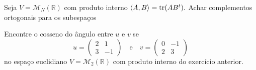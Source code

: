 \documentclass[11pt,a4paper]{article}
\begin{document}
\begin{exercicio} Seja $V = \mathcal{M}_N(\mathbb{R})$ com produto interno $\left\langle A,B \right\rangle = \mathrm{tr }(AB^t).$ Achar complementos ortogonais para os subespaços
\end{exercicio}
\solucao{}

\begin{exercicio}
Encontre o cosseno do ângulo entre $u$ e $v$ se 
\[
u = \begin{pmatrix}
2 & 1 \\ 3 & -1
\end{pmatrix} \quad \mbox{e} \quad v = \begin{pmatrix}
0 & -1 \\ 2 & 3
\end{pmatrix}
\]
no espaço euclidiano $V = \mathcal{M}_2(\mathbb{R})$ com produto interno do exercício anterior.
\end{exercicio}
\end{document}
